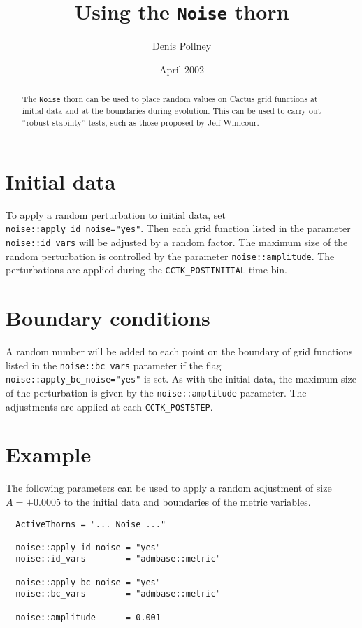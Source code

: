 \documentclass{article}
\begin{document}
\title{Using the \texttt{Noise} thorn}
\author{Denis Pollney}
\date{April 2002}

\maketitle


\begin{abstract}
The \texttt{Noise} thorn can be used to place random values on
Cactus grid functions at initial data and at the boundaries during
evolution. This can be used to carry out ``robust stability'' tests,
such as those proposed by Jeff Winicour.\\
\end{abstract}

\section{Initial data}

To apply a random perturbation to initial data, set
\texttt{noise::apply\_id\_noise="yes"}. Then each grid function
listed in the parameter \texttt{noise::id\_vars} will be adjusted
by a random factor. The maximum size of the random perturbation is
controlled by the parameter \texttt{noise::amplitude}. The
perturbations are applied during the \texttt{CCTK\_POSTINITIAL}
time bin.

\section{Boundary conditions}

A random number will be added to each point on the boundary of grid
functions listed in the \texttt{noise::bc\_vars} parameter if the
flag \texttt{noise::apply\_bc\_noise="yes"} is set. As with the
initial data, the maximum size of the perturbation is given by the
\texttt{noise::amplitude} parameter. The adjustments are applied at
each \texttt{CCTK\_POSTSTEP}.

\section{Example}

The following parameters can be used to apply a random adjustment 
of size $A=\pm0.0005$ to the initial data and boundaries of the metric
variables.
\begin{verbatim}
  ActiveThorns = "... Noise ..."

  noise::apply_id_noise = "yes"
  noise::id_vars        = "admbase::metric"

  noise::apply_bc_noise = "yes"
  noise::bc_vars        = "admbase::metric"

  noise::amplitude      = 0.001
\end{verbatim}

\end{document}
